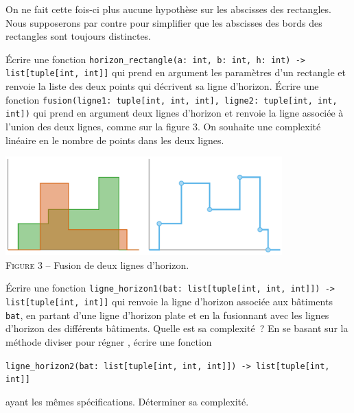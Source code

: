 \documentclass{magnolia}
\begin{document}
On ne fait cette fois-ci plus aucune hypothèse sur les abscisses des rectangles. Nous supposerons par contre
pour simplifier que les abscisses des bords des rectangles sont toujours distinctes.
\begin{questions}
\question Écrire une fonction \verb!horizon_rectangle(a: int, b: int, h: int) -> list[tuple[int, int]]! qui prend
  en argument les paramètres d'un rectangle et renvoie la liste des deux points qui décrivent sa ligne
  d'horizon.
\question Écrire une fonction \verb!fusion(ligne1: tuple[int, int, int], ligne2: tuple[int, int, int])! qui prend
  en argument deux lignes d'horizon et renvoie la ligne associée à l'union des deux lignes, comme sur la figure
  3. On souhaite une complexité linéaire en le nombre de points dans les deux lignes.
\begin{center}
\includegraphics[width=0.8\textwidth]{../../Commun/Images/python-tp-horizon-3}\\
\textsc{Figure 3} -- Fusion de deux lignes d'horizon.
\end{center}
\question Écrire une fonction \verb!ligne_horizon1(bat: list[tuple[int, int, int]]) -> list[tuple[int, int]]!
  qui renvoie la ligne d'horizon associée aux bâtiments \verb!bat!, en partant d'une ligne d'horizon
  plate et en la fusionnant avec les lignes d'horizon des différents bâtiments. Quelle est sa complexité~?
\question En se basant sur la méthode \og diviser pour régner \fg, écrire une fonction
\begin{center}
  \verb!ligne_horizon2(bat: list[tuple[int, int, int]]) -> list[tuple[int, int]]!
\end{center}
  ayant les mêmes spécifications. Déterminer sa complexité.

\end{questions}
\end{document}
